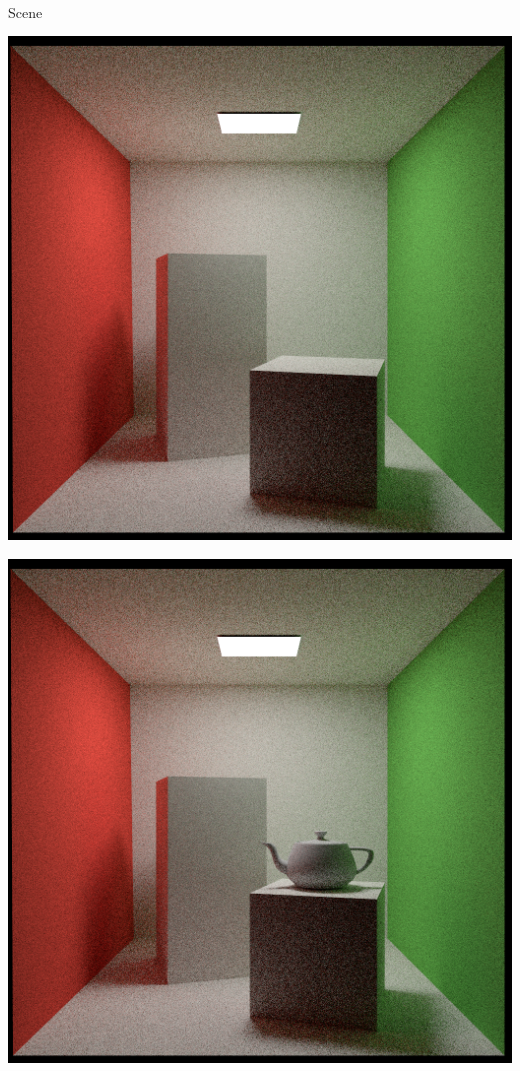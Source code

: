\documentclass[utf8,stillsansserifmath,fleqn,t]{beamer}
\begin{document}
\begin{frame}[label=bvh-results]
\frametitle{\insertsection}
~\\
\begin{minipage}{.33\textwidth}
Scene
\end{minipage}\hfill
\begin{minipage}{.33\textwidth}
\centerline{\includegraphics[width=.7\textwidth]{./fig/pathtracer-result-05-2.png}}
\end{minipage}\hfill
\begin{minipage}{.33\textwidth}
\centerline{\includegraphics[width=.7\textwidth]{./fig/pathtracer-result-06.png}}
\end{minipage}\\~\\
\begin{minipage}{.33\textwidth}

\end{minipage}
\end{frame}
\end{document}
